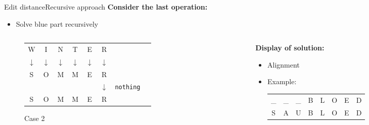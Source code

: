\begin{frame}{Edit distance}{Recursive approach}
  \textbf{Consider the last operation:}
  \begin{itemize}
    \item<2->
      Solve {\color{Mittel-Blau}blue} part recursively
  \end{itemize}
  \begin{columns}
    \begin{column}{0.3\linewidth}
      \begin{figure}[!h]
        \begin{center}
          \begin{tabular}{c@{}c@{}c@{}c@{}c@{}c@{}c@{}l}
            \color{Mittel-Blau}W & \color{Mittel-Blau}I & \color{Mittel-Blau}N &
            \color{Mittel-Blau}T & \color{Mittel-Blau}E & \color{Mittel-Blau}R\\
            \color{Mittel-Blau}$\downarrow$ & \color{Mittel-Blau}$\downarrow$ &
            \color{Mittel-Blau}$\downarrow$ & \color{Mittel-Blau}$\downarrow$ &
            \color{Mittel-Blau}$\downarrow$ & \color{Mittel-Blau}$\downarrow$\\
            \color{Mittel-Blau}S & \color{Mittel-Blau}O & \color{Mittel-Blau}M &
            \color{Mittel-Blau}M & \color{Mittel-Blau}E & \color{Mittel-Blau}R\\
            {} & {} & {} & {} & {} & $\downarrow$ & \texttt{nothing}\\
            S & O & M & M & E & R
          \end{tabular}
        \end{center}
        \caption{Case 2}
      \end{figure}
    \end{column}
    \begin{column}{0.5\linewidth}
      \textbf{Display of solution:}
      \begin{itemize}
        \item
          Alignment
        \item
          Example:
          \begin{tabular}{cccccccc}
            \_ & \_ & \_ & B & L & O & E & D\\
            S & A & U & B & L & O & E & D
          \end{tabular}
      \end{itemize}
    \end{column}
  \end{columns}
\end{frame}

